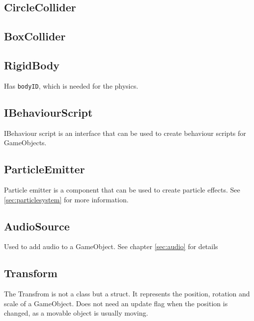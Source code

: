 \subsection{CircleCollider}

\subsection{BoxCollider}

\subsection{RigidBody}
Has \texttt{bodyID}, which is needed for the physics.

\subsection{IBehaviourScript}
IBehaviour script is an interface that can be used to create behaviour scripts for GameObjects.

\subsection{ParticleEmitter}
Particle emitter is a component that can be used to create particle effects.
See \autoref{sec:particlesystem} for more information.

\subsection{AudioSource}
Used to add audio to a GameObject. See chapter \autoref{sec:audio} for details

\subsection{Transform}
The Transfrom is not a class but a struct. It represents the position, rotation and scale of a GameObject.
Does not need an update flag when the position is changed, as a movable object is usually moving.



